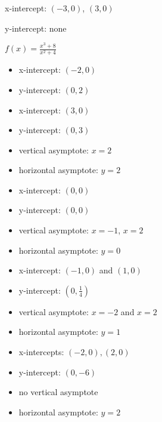 \documentclass{exam}
\begin{document}
\begin{description}
      \begin{itemize*}
        \item x-intercept: $(-3, 0)$, $(3, 0)$
        \item y-intercept: none
      \end{itemize*}

    \item[10] $f(x) = \frac{x^3 + 8}{x^2 + 4}$ 
      \begin{itemize}
        \item x-intercept: $(-2, 0)$
        \item y-intercept: $(0, 2)$
      \end{itemize}

    \item[11] 
      \begin{itemize}
        \item x-intercept: $(3, 0)$
        \item y-intercept: $(0, 3)$
        \item vertical asymptote: $x = 2$
        \item horizontal asymptote: $y = 2$
      \end{itemize}

    \item[12] 
      \begin{itemize}
        \item x-intercept: $(0, 0)$
        \item y-intercept: $(0, 0)$
        \item vertical asymptote: $x = -1$, $x = 2$
        \item horizontal asymptote: $y = 0$
      \end{itemize}

    \item[13] 
      \begin{itemize}
        \item x-intercept: $(-1, 0)$ and $(1, 0)$
        \item y-intercept: $\left( 0, \frac{1}{4} \right)$
        \item vertical asymptote: $x = -2$ and $x = 2$
        \item horizontal asymptote: $y = 1$
      \end{itemize}

    \item[14] 
      \begin{itemize}
        \item x-intercepts: $(-2, 0), (2, 0)$
        \item y-intercept: $\left( 0, -6 \right)$
        \item no vertical asymptote
        \item horizontal asymptote: $y = 2$
      \end{itemize}


\end{description}
\end{document}
